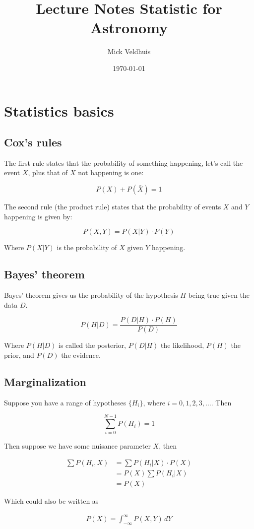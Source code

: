 \documentclass[a4paper]{article}
\title{Lecture Notes Statistic for Astronomy}
\author{Mick Veldhuis}
\date{\today}
\begin{document}
\maketitle

\tableofcontents

\section{Statistics basics}

\subsection{Cox's rules}

The first rule states that the probability of something happening, let's call the event $X$, plus that of $X$ not happening is one:

\begin{equation}
	P(X)+P(\bar{X})=1
\end{equation}

The second rule (the product rule) states that the probability of events $X$ and $Y$ happening is given by:

\begin{equation}
	P(X,Y)=P(X|Y)\cdot P(Y)
\end{equation}

Where $P(X|Y)$ is the probability of $X$ given $Y$ happening.

\subsection{Bayes' theorem}

Bayes' theorem gives us the probability of the hypothesis $H$ being true given the data $D$.

\begin{equation}
	P(H|D)=\frac{P(D|H)\cdot P(H)}{P(D)}
\end{equation}

Where $P(H|D)$ is called the posterior, $P(D|H)$ the likelihood, $P(H)$ the prior, and $P(D)$ the evidence. 

\subsection{Marginalization}

Suppose you have a range of hypotheses $\{H_i\}$, where $i=0,1,2,3,\dots$. Then

\begin{equation}
	\sum_{i=0}^{N-1} P(H_i)=1
\end{equation}

Then suppose we have some nuisance parameter $X$, then 

\begin{align}
	\sum P(H_i,X) &= \sum P(H_i|X)\cdot P(X)\\[1em]
	&= P(X)\sum P(H_i|X)\\[1em]
	&= P(X)
\end{align}

Which could also be written as

\begin{align}
	P(X)=\int_{-\infty}^{\infty} P(X,Y)\,dY
\end{align}
\end{document}
